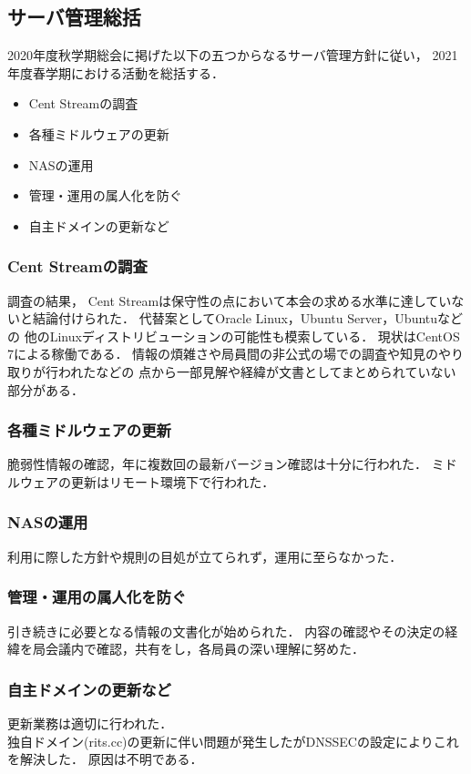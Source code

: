 \subsection*{サーバ管理総括}


2020年度秋学期総会に掲げた以下の五つからなるサーバ管理方針に従い，
2021年度春学期における活動を総括する．
\begin{itemize}
    \item Cent Streamの調査
    \item 各種ミドルウェアの更新
    \item NASの運用
    \item 管理・運用の属人化を防ぐ
    \item 自主ドメインの更新など
\end{itemize}

\subsubsection*{Cent Streamの調査}
調査の結果，
Cent Streamは保守性の点において本会の求める水準に達していないと結論付けられた．
代替案としてOracle Linux，Ubuntu Server，Ubuntuなどの
他のLinuxディストリビューションの可能性も模索している．
現状はCentOS 7による稼働である．
情報の煩雑さや局員間の非公式の場での調査や知見のやり取りが行われたなどの
点から一部見解や経緯が文書としてまとめられていない部分がある．

\subsubsection*{各種ミドルウェアの更新}
脆弱性情報の確認，年に複数回の最新バージョン確認は十分に行われた．
ミドルウェアの更新はリモート環境下で行われた．

\subsubsection*{NASの運用}
利用に際した方針や規則の目処が立てられず，運用に至らなかった．

\subsubsection*{管理・運用の属人化を防ぐ}
引き続きに必要となる情報の文書化が始められた．
内容の確認やその決定の経緯を局会議内で確認，共有をし，各局員の深い理解に努めた．

\subsubsection*{自主ドメインの更新など}
更新業務は適切に行われた．\\
独自ドメイン(rits.cc)の更新に伴い問題が発生したがDNSSECの設定によりこれを解決した．
原因は不明である．
